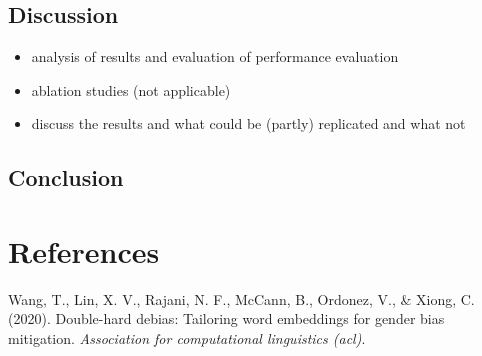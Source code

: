 \documentclass[
  english,
  man]{apa6}
\providecommand{\tightlist}{%
  \setlength{\itemsep}{0pt}\setlength{\parskip}{0pt}}
\begin{document}
\hypertarget{discussion}{%
\subsection{Discussion}\label{discussion}}

\begin{itemize}
\tightlist
\item
  analysis of results and evaluation of performance evaluation
\item
  ablation studies (not applicable)
\item
  discuss the results and what could be (partly) replicated and what not
\end{itemize}

\hypertarget{conclusion}{%
\subsection{Conclusion}\label{conclusion}}

\newpage

\hypertarget{references}{%
\section{References}\label{references}}

\begingroup
\setlength{\parindent}{-0.5in}
\setlength{\leftskip}{0.5in}

\hypertarget{refs}{}
\leavevmode\hypertarget{ref-wang2020doublehard}{}%
Wang, T., Lin, X. V., Rajani, N. F., McCann, B., Ordonez, V., \& Xiong, C. (2020). Double-hard debias: Tailoring word embeddings for gender bias mitigation. \emph{Association for computational linguistics (acl)}.

\endgroup
\end{document}
